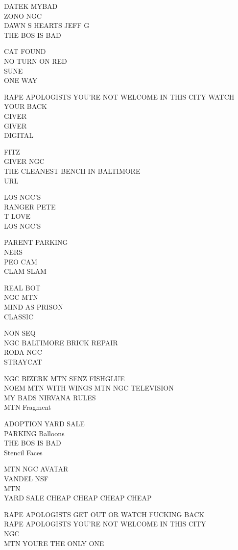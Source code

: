 \documentclass[10pt,letterpaper]{article}
\begin{document}
DATEK MYBAD\\
ZONO NGC\\
DAWN S HEARTS JEFF G\\
THE BOS IS BAD

CAT FOUND\\
NO TURN ON RED\\
SUNE\\
ONE WAY

RAPE APOLOGISTS YOU'RE NOT WELCOME IN THIS CITY WATCH YOUR BACK\\
GIVER\\
GIVER\\
DIGITAL

FITZ\\
GIVER NGC\\
THE CLEANEST BENCH IN BALTIMORE\\
URL

LOS NGC'S\\
RANGER PETE\\
T LOVE\\
LOS NGC'S

PARENT PARKING\\
NERS\\
PEO CAM\\
CLAM SLAM

REAL BOT\\
NGC MTN\\
MIND AS PRISON\\
CLASSIC

NON SEQ\\
NGC BALTIMORE BRICK REPAIR\\
RODA NGC\\
STRAYCAT

NGC BIZERK MTN SENZ FISHGLUE\\
NOEM MTN WITH WINGS MTN NGC TELEVISION\\
MY BADS NIRVANA RULES\\
MTN Fragment

ADOPTION YARD SALE\\
PARKING Balloons\\
THE BOS IS BAD\\
Stencil Faces

MTN NGC AVATAR\\
VANDEL NSF\\
MTN\\
YARD SALE CHEAP CHEAP CHEAP CHEAP

RAPE APOLOGISTS GET OUT OR WATCH FUCKING BACK\\
RAPE APOLOGISTS YOU'RE NOT WELCOME IN THIS CITY\\
NGC\\
MTN YOURE THE ONLY ONE
\end{document}
